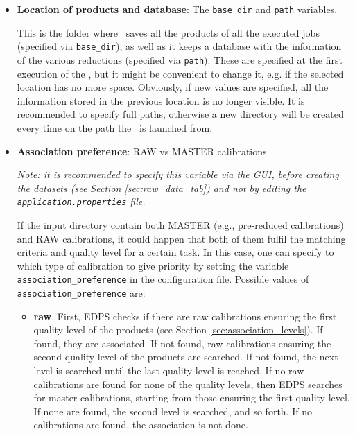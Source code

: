 \begin{itemize}
\item {\bf Location of products and database}: The {\tt base\_dir}  and {\tt path} variables.

  This is the folder where \edps\ saves all the products of all the executed jobs (specified via  {\tt base\_dir}), as well as it keeps a database with the information of the various reductions (specified via {\tt path}). These are specified at the first execution of the \edpsgui, but
  it might be convenient to change it, e.g. if the selected location has no more space.
  Obviously, if new values are specified, all the information stored in the previous location is no longer visible.
  It is recommended to specify full paths, otherwise a new directory will be created every time on the path the \edpsgui\ is launched from.

\item {\bf Association preference}: RAW vs MASTER calibrations.
\label{list:association_preferences}

   {\it Note: it is recommended to specify this variable via the GUI, before 
   creating the datasets (see Section \ref{sec:raw_data_tab})   
   and not by editing the {\tt application.properties} file.}
 
   If the input directory contain both MASTER (e.g., pre-reduced calibrations) and RAW calibrations, it could happen that both of them fulfil the matching criteria and quality level for a certain task. In this case, one can specify to which type of calibration to give priority by setting the variable {\tt association\_preference} in the  configuration file.  Possible values of {\tt association\_preference} are:
   
   \begin{itemize}
    \item  {\bf raw}. First, EDPS checks if there are raw calibrations ensuring the first quality level of the products (see Section \ref{sec:association_levels}). If found, they are associated. If not found, raw calibrations ensuring the second quality
    level of the products are searched. If not found, the next level is searched until the last quality level  is reached.
    If no raw calibrations are found for none of the quality levels, then EDPS searches for master calibrations, starting from those ensuring the first quality level. If none are found, the second
    level is searched, and so forth. If no calibrations are found, the association is not done.
    

\end{itemize}
\end{itemize}
